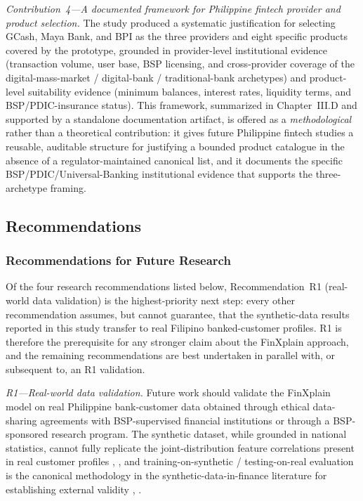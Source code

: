 \documentclass[journal]{./IEEE/IEEEtran}
\begin{document}
\textit{Contribution~4---A documented framework for Philippine fintech provider and product selection.} The study produced a systematic justification for selecting GCash, Maya Bank, and BPI as the three providers and eight specific products covered by the prototype, grounded in provider-level institutional evidence (transaction volume, user base, BSP licensing, and cross-provider coverage of the digital-mass-market / digital-bank / traditional-bank archetypes) and product-level suitability evidence (minimum balances, interest rates, liquidity terms, and BSP/PDIC-insurance status). This framework, summarized in Chapter~III.D and supported by a standalone documentation artifact, is offered as a \emph{methodological} rather than a theoretical contribution: it gives future Philippine fintech studies a reusable, auditable structure for justifying a bounded product catalogue in the absence of a regulator-maintained canonical list, and it documents the specific BSP/PDIC/Universal-Banking institutional evidence that supports the three-archetype framing.

\subsection{Recommendations}

\subsubsection{Recommendations for Future Research}

Of the four research recommendations listed below, Recommendation~R1 (real-world data validation) is the highest-priority next step: every other recommendation assumes, but cannot guarantee, that the synthetic-data results reported in this study transfer to real Filipino banked-customer profiles. R1 is therefore the prerequisite for any stronger claim about the FinXplain approach, and the remaining recommendations are best undertaken in parallel with, or subsequent to, an R1 validation.

\textit{R1---Real-world data validation.} Future work should validate the FinXplain model on real Philippine bank-customer data obtained through ethical data-sharing agreements with BSP-supervised financial institutions or through a BSP-sponsored research program. The synthetic dataset, while grounded in national statistics, cannot fully replicate the joint-distribution feature correlations present in real customer profiles \cite{ref29}, \cite{ref34}, and training-on-synthetic / testing-on-real evaluation is the canonical methodology in the synthetic-data-in-finance literature for establishing external validity \cite{ref46}, \cite{ref83}. 
\end{document}
